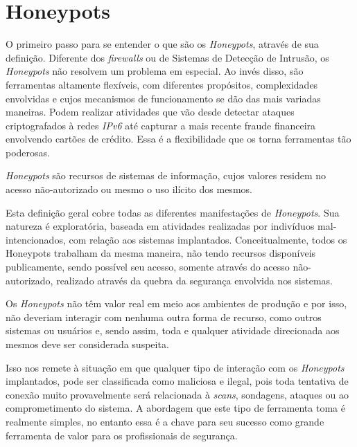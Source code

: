 \chapter{Honeypots}\label{capitulo:honeypots}


O primeiro passo para se entender o que são os \textit{Honeypots}, através de sua definição. Diferente dos \textit{firewalls} ou de Sistemas de Detecção de Intrusão, os \textit{Honeypots} não resolvem um problema em especial. Ao invés disso, são ferramentas altamente flexíveis, com diferentes propósitos, complexidades envolvidas e cujos mecanismos de funcionamento se dão das mais variadas maneiras. Podem realizar atividades que vão desde detectar ataques criptografados à redes \textit{IPv6} até capturar a mais recente fraude financeira envolvendo cartões de crédito. Essa é a flexibilidade que os torna ferramentas tão poderosas. \cite{DefinitioHoneypots}

\textit{Honeypots} são recursos de sistemas de informação, cujos valores residem no acesso não-autorizado ou mesmo o uso ilícito dos mesmos.

Esta definição geral cobre todas as diferentes manifestações de \textit{Honeypots}. Sua natureza é exploratória, baseada em atividades realizadas por indivíduos mal-intencionados, com relação aos sistemas implantados. Conceitualmente, todos os Honeypots trabalham da mesma maneira, não tendo recursos disponíveis publicamente, sendo possível seu acesso, somente através do acesso não-autorizado, realizado através da quebra da segurança envolvida nos sistemas. \cite{WhitepaperHoneypots}

Os \textit{Honeypots} não têm valor real em meio aos ambientes de produção e por isso, não deveriam interagir com nenhuma outra forma de recurso, como outros sistemas ou usuários e, sendo assim, toda e qualquer atividade direcionada aos mesmos deve ser considerada suspeita.

Isso nos remete à situação em que qualquer tipo de interação com os \textit{Honeypots} implantados, pode ser classificada como maliciosa e ilegal, pois toda tentativa de conexão muito provavelmente será relacionada à \textit{scans}, sondagens, ataques ou ao comprometimento do sistema. A abordagem que este tipo de ferramenta toma é realmente simples, no entanto essa é a chave para seu sucesso como grande ferramenta de valor para os profissionais de segurança.


